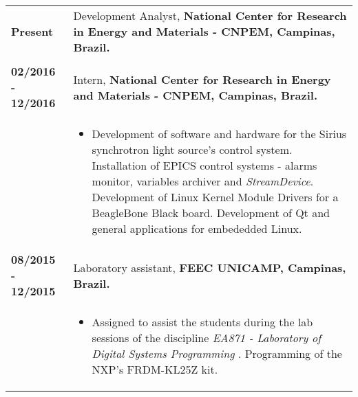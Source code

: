 \documentclass[10pt, a4paper]{article}
\begin{document}
\begin{tabular}{p{} p{}}

\textbf{Present}  & Development Analyst, \textbf{National Center for Research in
Energy and Materials - CNPEM, Campinas, Brazil.}
\\
& \vspace{-12pt}
\\

\textbf{02/2016 - 12/2016}  & Intern, \textbf{National Center for Research in
Energy and Materials - CNPEM, Campinas, Brazil.}
 \\
  & \vspace{-12pt}
  \begin{itemize}
    \item Development of software and hardware for the Sirius synchrotron light
    source's control system. Installation of EPICS
    control systems - alarms monitor, variables archiver and \textit{StreamDevice}.
    Development of Linux Kernel Module Drivers for a BeagleBone Black board.
    Development of Qt and general applications for
    embededded Linux.
    
	\end{itemize}\\

\textbf{08/2015 - 12/2015}  & Laboratory assistant, \textbf{FEEC
 UNICAMP, Campinas, Brazil.}
 \\
  & \vspace{-12pt}
  \begin{itemize}
    \item Assigned to assist the students during the lab sessions of the
    discipline \textit{EA871 - Laboratory of Digital Systems Programming
    }. Programming of the NXP's FRDM-KL25Z kit.
        
	\end{itemize}\\




\end{tabular}
\end{document}
